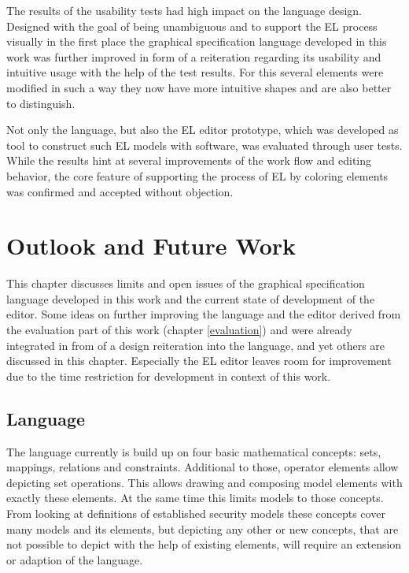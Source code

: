 \documentclass[twoside, openright, 12pt]{book}
\begin{document}
The results of the usability tests had high impact on the language design.
Designed with the goal of being unambiguous and to support the EL process visually in the first place the graphical specification language developed in this work was further improved in form of a reiteration regarding its usability and intuitive usage with the help of the test results.
For this several elements were modified in such a way they now have more intuitive shapes and are also better to distinguish.

Not only the language, but also the EL editor prototype, which was developed as tool to construct such EL models with software, was evaluated through user tests.
While the results hint at several improvements of the work flow and editing behavior, the core feature of supporting the process of EL by coloring elements was confirmed and accepted without objection.



\cleardoublepage
\chapter{Outlook and Future Work}
\label{future_work}
This chapter discusses limits and open issues of the graphical specification language developed in this work and the current state of development of the editor.
Some ideas on further improving the language and the editor derived from the evaluation part of this work (chapter \ref{evaluation}) and were already integrated in from of a design reiteration into the language, and yet others are discussed in this chapter.
Especially the EL editor leaves room for improvement due to the time restriction for development in context of this work.

\section{Language}
\label{future_GSL}
The language currently is build up on four basic mathematical concepts: sets, mappings, relations and constraints.
Additional to those, operator elements allow depicting set operations.
This allows drawing and composing model elements with exactly these elements.
At the same time this limits models to those concepts.
From looking at definitions of established security models these concepts cover many models and its elements, but depicting any other or new concepts, that are not possible to depict with the help of existing elements, will require an extension or adaption of the language.
\end{document}
